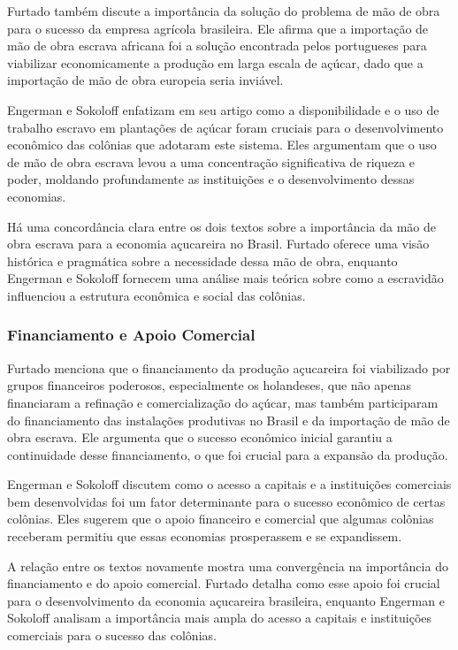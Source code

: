 \documentclass[a4paper,12pt]{article}[abntex2]
\begin{document}
Furtado também discute a importância da solução do problema de mão de obra para o sucesso da empresa agrícola brasileira. Ele afirma que a importação de mão de obra escrava africana foi a solução encontrada pelos portugueses para viabilizar economicamente a produção em larga escala de açúcar, dado que a importação de mão de obra europeia seria inviável.

Engerman e Sokoloff enfatizam em seu artigo como a disponibilidade e o uso de trabalho escravo em plantações de açúcar foram cruciais para o desenvolvimento econômico das colônias que adotaram este sistema. Eles argumentam que o uso de mão de obra escrava levou a uma concentração significativa de riqueza e poder, moldando profundamente as instituições e o desenvolvimento dessas economias.

Há uma concordância clara entre os dois textos sobre a importância da mão de obra escrava para a economia açucareira no Brasil. Furtado oferece uma visão histórica e pragmática sobre a necessidade dessa mão de obra, enquanto Engerman e Sokoloff fornecem uma análise mais teórica sobre como a escravidão influenciou a estrutura econômica e social das colônias.

\subsubsection*{Financiamento e Apoio Comercial}

Furtado menciona que o financiamento da produção açucareira foi viabilizado por grupos financeiros poderosos, especialmente os holandeses, que não apenas financiaram a refinação e comercialização do açúcar, mas também participaram do financiamento das instalações produtivas no Brasil e da importação de mão de obra escrava. Ele argumenta que o sucesso econômico inicial garantiu a continuidade desse financiamento, o que foi crucial para a expansão da produção.

Engerman e Sokoloff discutem como o acesso a capitais e a instituições comerciais bem desenvolvidas foi um fator determinante para o sucesso econômico de certas colônias. Eles sugerem que o apoio financeiro e comercial que algumas colônias receberam permitiu que essas economias prosperassem e se expandissem.

A relação entre os textos novamente mostra uma convergência na importância do financiamento e do apoio comercial. Furtado detalha como esse apoio foi crucial para o desenvolvimento da economia açucareira brasileira, enquanto Engerman e Sokoloff analisam a importância mais ampla do acesso a capitais e instituições comerciais para o sucesso das colônias.
\end{document}
